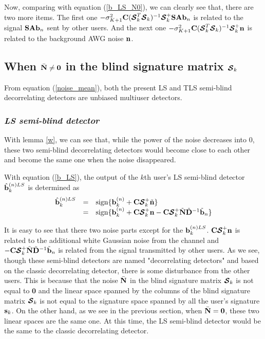 \documentclass[a4paper,11pt,fleqn]{article}
\newcommand{\bA}{{\mathbf A}}
\newcommand{\bb}{{\bf b}}
\newcommand{\bC}{{\bf C}}
\newcommand{\bs}{{\bf s}}
\newcommand{\bn}{{\bf n}}
\newcommand{\bN}{{\bf N}}
\newcommand{\bS}{{\bf S}}
\newcommand{\bD}{{\bf D}}
\newcommand{\bcS}{{\mbox {\boldmath ${\cal S}$}}}
\begin{document}
Now, comparing with equation (\ref{b_LS_N0}), we can clearly see
that, there are two more items. The first one
$-\sigma_{K+1}^2\bC(\bcS_k^T\bcS_k)^{-1}\bcS_k^{+}\bS\bA\bb_n$ is
related to the signal $\bS\bA\bb_n$ sent by other users. And the
next one $-\sigma_{K+1}^2\bC(\bcS_k^T\bcS_k)^{-1}\bcS_k^+\bn$ is
related to the background AWG noise $\bn$.

\subsection*{When $\bar{\bN}\neq \mathbf{0}$ in the blind signature matrix $\bcS_k$}

From equation (\ref{noise_mean}), both the present LS and TLS
semi-blind decorrelating detectors are unbiased multiuser
detectors.

\subsubsection*{\em LS semi-blind detector \em }

With lemma \ref{w}, we can see that, while the power of the noise
decreases into 0, these two semi-blind decorrelating detectors
would become close to each other and become the same one when the
noise disappeared.

With equation (\ref{b_LS}), the output of the $k$th user's LS
semi-blind detector $\hat{\bb}_k^{(n) LS}$ is determined as
\begin{equation}
\begin{array}{rcl}
\hat{\bb}_k^{(n) LS}
 &=&\mbox{sign}\{\bb_k^{(n)}+\bC\bcS_k^+\tilde{\bn}\}\\
 &=&\mbox{sign}\{\bb_k^{(n)}+\bC\bcS_k^+\bn-\bC\bcS_k^+\tilde{\bN}\tilde{\bD}^{-1}\tilde{\bb}_n\}
\end{array} \label{b_LS_N1}
\end{equation}

It is easy to see that there two noise parts except for the
$\bb_k^{(n) LS}$. $\bC\bcS_k^+\bn$ is related to the additional
white Gaussian noise from the channel and
$-\bC\bcS_k^+\tilde{\bN}\tilde{\bD}^{-1}\tilde{\bb}_n$ is related
from the signal transmitted by other users. As we see, though
these semi-blind detectors are named "decorrelating detectors" and
based on the classic decorrelating detector, there is some
disturbance from the other users. This is because that the noise
$\bar{\bN}$ in the blind signature matrix $\bcS_k$ is not equal to
$\mathbf{0}$ and the linear space spanned by the columns of the
blind signature matrix $\bcS_k$ is not equal to the signature
space spanned by all the user's signature $\bs_k$. On the other
hand, as we see in the previous section, when
$\bar{\bN}=\mathbf{0}$, these two linear spaces are the same one.
At this time, the LS semi-blind detector would be the same to the
classic decorrelating detector.
\end{document}
